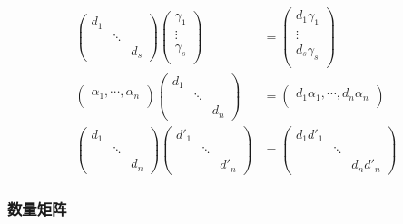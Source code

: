 \begin{Note}
\[
\begin{aligned}
\begin{pmatrix}
d_1 &   &    \\
    & \ddots & \\
    &        &d_s
\end{pmatrix} 
\begin{pmatrix}
\gamma_1 \\
\vdots \\
\gamma_s \\
\end{pmatrix} 
&= 
\begin{pmatrix}
d_1 \gamma_1 \\
\vdots \\
d_s \gamma_s \\
\end{pmatrix} \\
\begin{pmatrix}
\alpha_1, \cdots, \alpha_n \\
\end{pmatrix} 
\begin{pmatrix}
d_1 &   &    \\
    & \ddots & \\
    &        &d_n
\end{pmatrix} 
&=
\begin{pmatrix}
d_1 \alpha_1, \cdots, d_n \alpha_n \\
\end{pmatrix} \\
\begin{pmatrix}
d_1 &   &    \\
    & \ddots & \\
    &        &d_n
\end{pmatrix} 
\begin{pmatrix}
d'_1 &   &    \\
    & \ddots & \\
    &        &d'_n
\end{pmatrix} 
&=
\begin{pmatrix}
d_1 d'_1 &   &    \\
    & \ddots & \\
    &        &d_n d'_n
\end{pmatrix} 
\end{aligned} 
\]
\end{Note}

\subsubsection{数量矩阵}

